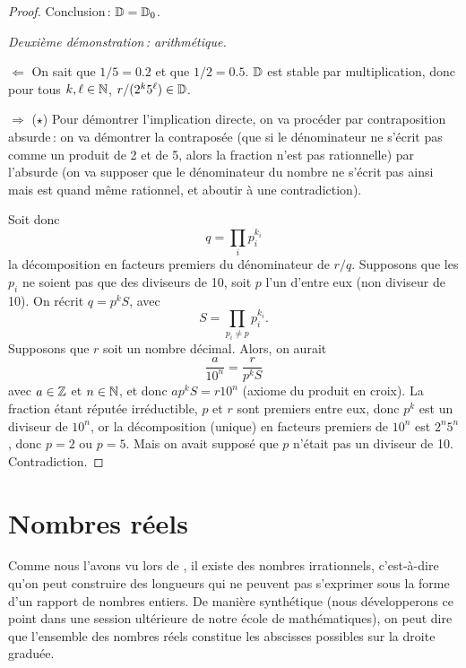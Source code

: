 \begin{proof}
			Conclusion\,: $\mathbb{D}=\mathbb{D}_0$.

			\noindent\emph{Deuxième démonstration\,: arithmétique.}
			
			$\Leftarrow$ On sait que $1/5=0.2$ et que $1/2=0.5$. $\mathbb{D}$ est stable par multiplication, donc pour tous $k,\ell\in\mathbb{N}$, $r/(2^k5^\ell)\in\mathbb{D}$.

			$\Rightarrow$ ($\star$) Pour démontrer l'implication directe, on va procéder par contraposition absurde\,: on va démontrer la contraposée (que si le dénominateur ne s'écrit pas comme un produit de 2 et de 5, alors la fraction n'est pas rationnelle) par l'absurde (on va supposer que le dénominateur du nombre ne s'écrit pas ainsi mais est quand même rationnel, et aboutir à une contradiction).

			Soit donc
			\begin{equation}
				q=\prod_i p_i^{k_i}
			\end{equation} 
			la décomposition en facteurs premiers du dénominateur de $r/q$. Supposons que les $p_i$ ne soient pas que des diviseurs de 10, soit $p$ l'un d'entre eux (non diviseur de 10). On récrit $q=p^kS$, avec 
			\begin{equation}
			 S=\prod_{p_i\ne p}p_i^{k_i}.\end{equation} 
			Supposons que $r$ soit un nombre décimal. Alors, on aurait
			\begin{equation}
				\frac{a}{10^n}=\frac{r}{p^kS}
			\end{equation}
			avec $a\in\mathbb{Z}$ et $n\in\mathbb{N}$, et donc $ap^kS=r10^n$ (axiome du produit en croix).
			La fraction étant réputée irréductible, $p$ et $r$ sont premiers entre eux, donc $p^k$ est un diviseur de $10^n$, or la décomposition (unique) en facteurs premiers de $10^n$ est $2^n5^n$, donc $p=2$ ou $p=5$. Mais on avait supposé que $p$ n'était pas un diviseur de 10. Contradiction. 
		\end{proof}

	\section{Nombres réels}
		Comme nous l'avons vu lors de , il existe des nombres irrationnels, c'est-à-dire qu'on peut construire des longueurs qui ne peuvent pas s'exprimer sous la forme d'un rapport de nombres entiers. De manière synthétique (nous développerons ce point dans une session ultérieure de notre école de mathématiques), on peut dire que l'ensemble des nombres réels constitue  les abscisses possibles sur la droite graduée.

